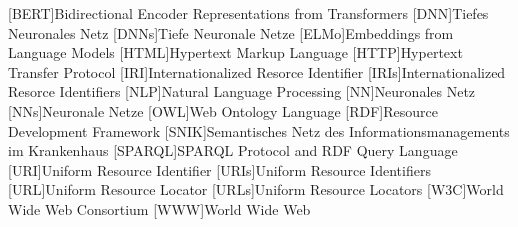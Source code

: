 \begin{acronym}
[BERT]{Bidirectional Encoder Representations from Transformers}
[DNN]{Tiefes Neuronales Netz}
[DNNs]{Tiefe Neuronale Netze}
[ELMo]{Embeddings from Language Models}
[HTML]{Hypertext Markup Language}
[HTTP]{Hypertext Transfer Protocol}
[IRI]{Internationalized Resorce Identifier}
[IRIs]{Internationalized Resorce Identifiers}
[NLP]{Natural Language Processing}
[NN]{Neuronales Netz}
[NNs]{Neuronale Netze}
[OWL]{Web Ontology Language}
[RDF]{Resource Development Framework}
[SNIK]{Semantisches Netz des Informationsmanagements im Krankenhaus}
[SPARQL]{SPARQL Protocol and RDF Query Language}
[URI]{Uniform Resource Identifier}
[URIs]{Uniform Resource Identifiers}
[URL]{Uniform Resource Locator}
[URLs]{Uniform Resource Locators}
[W3C]{World Wide Web Consortium}
[WWW]{World Wide Web}
\end{acronym}
